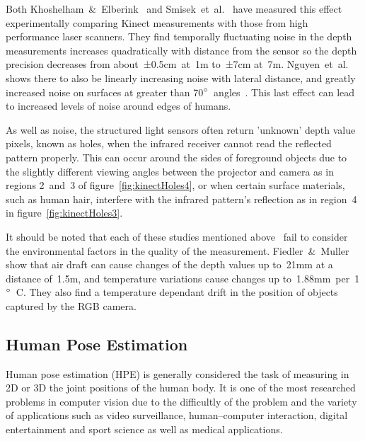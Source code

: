 \documentclass[11pt]{article} %
\begin{document}
Both Khoshelham~\&~Elberink~\cite{Khoshelham2012a} and Smisek~et~al.~\cite{Smisek2011} have measured this effect experimentally comparing Kinect measurements with those from high performance laser scanners. They find temporally fluctuating noise in the depth measurements increases quadratically with distance from the sensor so the depth precision decreases from about~±0.5cm~at~1m to~±7cm at~7m. Nguyen~et~al. shows there to also be linearly increasing noise with lateral distance, and greatly increased noise on surfaces at greater than 70$\degree$~angles~\cite{Nguyen2012}. This last effect can lead to increased levels of noise around edges of humans. 

As well as noise, the structured light sensors often return 'unknown' depth value pixels, known as holes, when the infrared receiver cannot read the reflected pattern properly. This can occur around the sides of foreground objects due to the slightly different viewing angles between the projector and camera as in regions 2~and~3 of figure~\ref{fig:kinectHoles4}, or when certain surface materials, such as human hair, interfere with the infrared pattern's reflection as in region~4 in figure~\ref{fig:kinectHoles3}. 

It should be noted that each of these studies mentioned above~\cite{Khoshelham2012a,Smisek2011,Nguyen2012} fail to consider the environmental factors in the quality of the measurement. Fiedler~\&~Muller \cite{Fiedler2013} show that air draft can cause changes of the depth values up to~21mm at a distance of~1.5m, and temperature variations cause changes up to~1.88mm~per~1$\degree$~C. They also find a temperature dependant drift in the position of objects captured by the RGB camera.

\subsection{Human Pose Estimation}

Human pose estimation (HPE) is generally considered the task of measuring in 2D or 3D the joint positions of the human body. It is one of the most researched problems in computer vision due to the difficultly of the problem and the variety of applications such as video surveillance, human–computer interaction, digital entertainment and sport science as well as medical applications.

\end{document}

